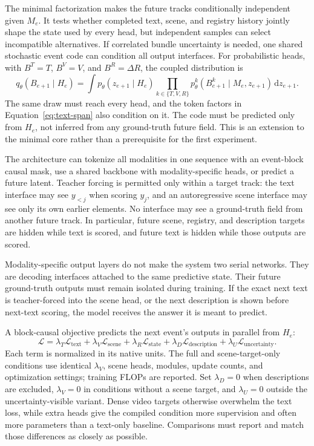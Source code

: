 \documentclass[11pt]{article}
\newcommand{\loss}{\mathcal{L}}
\begin{document}
The minimal factorization makes the future tracks conditionally independent given $M_e$. It tests whether completed text, scene, and registry history jointly shape the state used by every head, but independent samples can select incompatible alternatives. If correlated bundle uncertainty is needed, one shared stochastic event code can condition all output interfaces. For probabilistic heads, with $B^T=T$, $B^V=V$, and $B^R=\Delta R$, the coupled distribution is
\begin{equation}
  q_\theta(B_{e+1}\mid H_e)
  =\int p_\theta(z_{e+1}\mid H_e)
  \prod_{k\in\{T,V,R\}}p_\theta^k(B_{e+1}^k\mid M_e,z_{e+1})\,\mathrm dz_{e+1}.
  \label{eq:event-code}
\end{equation}
The same draw must reach every head, and the token factors in Equation~\ref{eq:text-span} also condition on it. The code must be predicted only from $H_e$, not inferred from any ground-truth future field. This is an extension to the minimal core rather than a prerequisite for the first experiment.

The architecture can tokenize all modalities in one sequence with an event-block causal mask, use a shared backbone with modality-specific heads, or predict a future latent. Teacher forcing is permitted only within a target track: the text interface may see $y_{<j}$ when scoring $y_j$, and an autoregressive scene interface may see only its own earlier elements. No interface may see a ground-truth field from another future track. In particular, future scene, registry, and description targets are hidden while text is scored, and future text is hidden while those outputs are scored.

Modality-specific output layers do not make the system two serial networks. They are decoding interfaces attached to the same predictive state. Their future ground-truth outputs must remain isolated during training. If the exact next text is teacher-forced into the scene head, or the next description is shown before next-text scoring, the model receives the answer it is meant to predict.

A block-causal objective predicts the next event's outputs in parallel from $H_e$:
\begin{equation}
  \loss=\lambda_T\loss_{\mathrm{text}}
  +\lambda_V\loss_{\mathrm{scene}}
  +\lambda_R\loss_{\mathrm{state}}
  +\lambda_D\loss_{\mathrm{description}}
  +\lambda_U\loss_{\mathrm{uncertainty}}.
  \label{eq:loss}
\end{equation}
Each term is normalized in its native units. The full and scene-target-only conditions use identical $\lambda_V$, scene heads, modules, update counts, and optimization settings; training FLOPs are reported. Set $\lambda_D=0$ when descriptions are excluded, $\lambda_V=0$ in conditions without a scene target, and $\lambda_U=0$ outside the uncertainty-visible variant. Dense video targets otherwise overwhelm the text loss, while extra heads give the compiled condition more supervision and often more parameters than a text-only baseline. Comparisons must report and match those differences as closely as possible.
\end{document}
